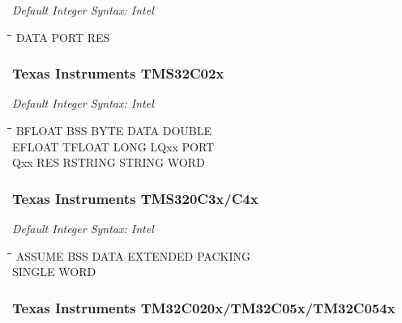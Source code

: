 {\em Default Integer Syntax: Intel}

{\tt\begin{tabbing}
\hspace{3cm}\=\hspace{3cm}\=\hspace{3cm}\=\hspace{3cm}\=\kill
DATA       \> PORT        \> RES \\
\end{tabbing}}

\subsubsection{Texas Instruments TMS32C02x}

{\em Default Integer Syntax: Intel}

{\tt\begin{tabbing}
\hspace{3cm}\=\hspace{3cm}\=\hspace{3cm}\=\hspace{3cm}\=\kill
BFLOAT     \> BSS         \> BYTE        \> DATA        \> DOUBLE \\ 
EFLOAT     \> TFLOAT      \> LONG        \> LQxx        \> PORT \\
Qxx        \> RES         \> RSTRING     \> STRING      \> WORD \\
\end{tabbing}}

\subsubsection{Texas Instruments TMS320C3x/C4x}

{\em Default Integer Syntax: Intel}

{\tt\begin{tabbing}
\hspace{3cm}\=\hspace{3cm}\=\hspace{3cm}\=\hspace{3cm}\=\kill
ASSUME     \> BSS         \> DATA        \> EXTENDED    \> PACKING \\
SINGLE     \> WORD \\
\end{tabbing}}

\subsubsection{Texas Instruments TM32C020x/TM32C05x/TM32C054x}

